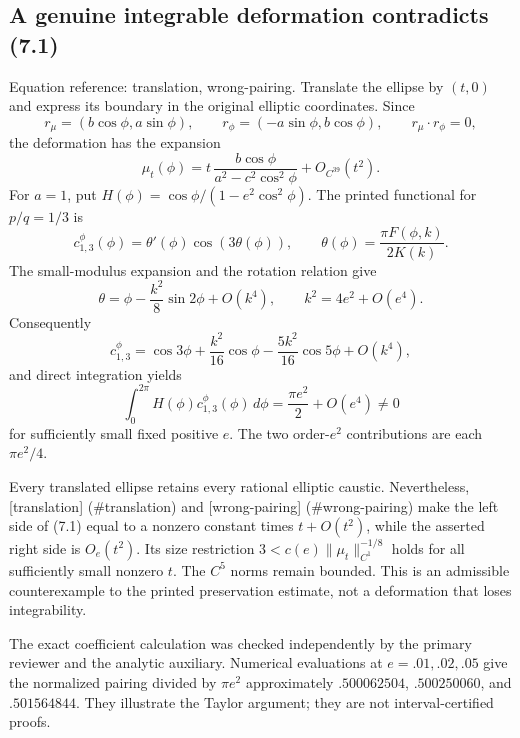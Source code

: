 \documentclass[10pt]{article}
\begin{document}
\subsection*{A genuine integrable deformation contradicts (7.1)}
Equation reference: translation, wrong-pairing. Translate the ellipse by \((t,0)\) and express its boundary in the original elliptic coordinates. Since \[r_\mu=(b\cos\phi,a\sin\phi),\qquad
 r_\phi=(-a\sin\phi,b\cos\phi),\qquad r_\mu\cdot r_\phi=0,\] the deformation has the expansion \[
 \mu_t(\phi)
 =t\,\frac{b\cos\phi}{a^2-c^2\cos^2\phi}+O_{C^{39}}(t^2).\] For \(a=1\), put \(H(\phi)=\cos\phi/(1-e^2\cos^2\phi)\). The printed functional for \(p/q=1/3\) is \[c^\phi_{1,3}(\phi)=\theta'(\phi)\cos(3\theta(\phi)),
 \qquad
 \theta(\phi)=\frac{\pi F(\phi,k)}{2K(k)}.\] The small-modulus expansion and the rotation relation give \[\theta=\phi-\frac{k^2}{8}\sin2\phi+O(k^4),
 \qquad k^2=4e^2+O(e^4).\] Consequently \[c^\phi_{1,3}
 =\cos3\phi+\frac{k^2}{16}\cos\phi
              -\frac{5k^2}{16}\cos5\phi+O(k^4),\] and direct integration yields \[
 \int_0^{2\pi}H(\phi)c^\phi_{1,3}(\phi)\,d\phi
 =\frac{\pi e^2}{2}+O(e^4)\neq0\] for sufficiently small fixed positive \(e\). The two order-\(e^2\) contributions are each \(\pi e^2/4\).\par
Every translated ellipse retains every rational elliptic caustic. Nevertheless, [translation] (\#translation) and [wrong-pairing] (\#wrong-pairing) make the left side of (7.1) equal to a nonzero constant times \(t+O(t^2)\), while the asserted right side is \(O_e(t^2)\). Its size restriction \(3<c(e)\|\mu_t\|_{C^1}^{-1/8}\) holds for all sufficiently small nonzero \(t\). The \(C^5\) norms remain bounded. This is an admissible counterexample to the printed preservation estimate, not a deformation that loses integrability.\par
The exact coefficient calculation was checked independently by the primary reviewer and the analytic auxiliary. Numerical evaluations at \(e=.01,.02,.05\) give the normalized pairing divided by \(\pi e^2\) approximately \(.500062504\), \(.500250060\), and \(.501564844\). They illustrate the Taylor argument; they are not interval-certified proofs.\par
\end{document}
